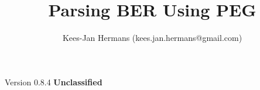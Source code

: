 \documentclass[twoside,a4paper]{refart}
\title{Parsing BER Using PEG}
\begin{document}
\maketitle

\begin{flushright}
\author{Kees-Jan Hermans (kees.jan.hermans@gmail.com)}
\date{}
\end{flushright}



\vfill
\begin{flushright}
Version 0.8.4
\textbf{Unclassified}

\end{flushright}

\newpage
\tableofcontents

\raggedbottom

\newpage



\printindex
\end{document}
